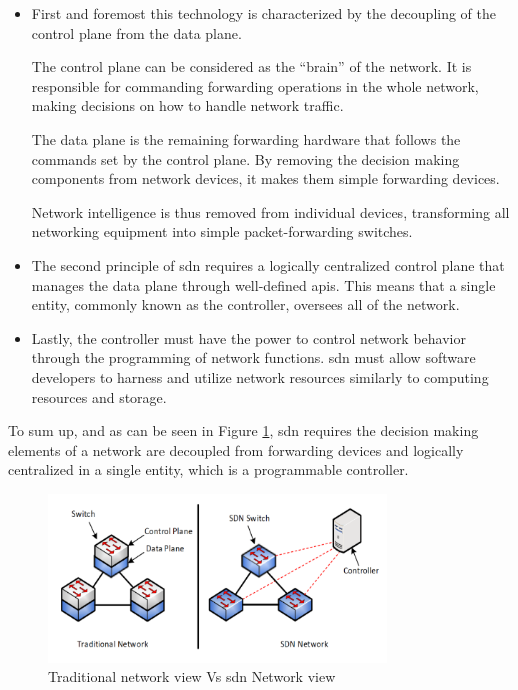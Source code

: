 \begin{itemize}

	\item First and foremost this technology is characterized by the decoupling of the control plane from the data plane. 

    The control plane can be considered as the “brain” of the network. It is responsible for commanding forwarding operations in the whole network, making decisions on how to handle network traffic.  

    The data plane is the remaining forwarding hardware that follows the commands set by the control plane. By removing the decision making components from network devices, it makes them simple forwarding devices.

    Network intelligence is thus removed from individual devices, transforming all networking equipment into simple packet-forwarding switches.

	\item The second principle of \gls{sdn} requires a logically centralized control plane that manages the data plane through well-defined \glspl{api}. This means that a single entity, commonly known as the controller, oversees all of the network. 

	\item Lastly, the controller must have the power to control network behavior through the programming of network functions. \gls{sdn} must allow software developers to harness and utilize network resources similarly to computing resources and storage. 

\end{itemize}

To sum up, and as can be seen in Figure \ref{fig:sdn_vs_legacy}, \gls{sdn} requires the decision making elements of a network are decoupled from forwarding devices and logically centralized in a single entity, which is a programmable controller. 

\begin{figure}
	\centering
	\includegraphics[width=0.8\textwidth]{Chapters/Figures/SDNs/sdn_vs_legacy.png}
	\caption{Traditional network view Vs \gls{sdn} Network view\cite{alowa_scalable_2020}}
	\label{fig:sdn_vs_legacy}
\end{figure}

